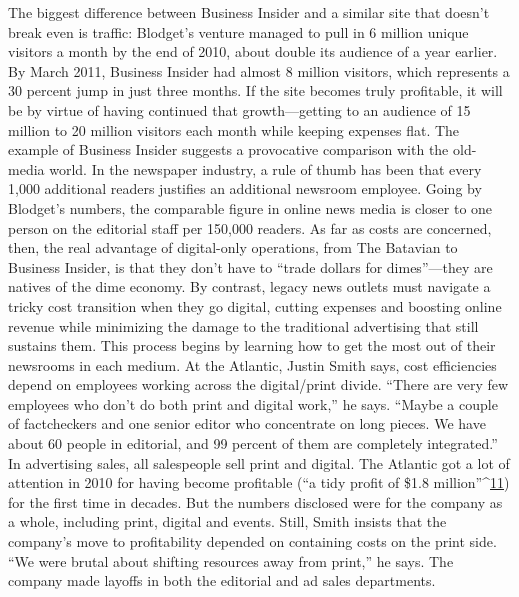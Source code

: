 
The biggest difference between Business Insider and a similar site that doesn't
break even is traffic: Blodget's venture managed to pull in 6 million unique visitors
a month by the end of 2010, about double its audience of a year earlier. By
March 2011, Business Insider had almost 8 million visitors, which represents a 30
percent jump in just three months. If the site becomes truly profitable, it will be
by virtue of having continued that growth—getting to an audience of 15 million
to 20 million visitors each month while keeping expenses flat.
The example of Business Insider suggests a provocative comparison with the
old-media world. In the newspaper industry, a rule of thumb has been that every
1,000 additional readers justifies an additional newsroom employee. Going by
Blodget's numbers, the comparable figure in online news media is closer to one
person on the editorial staff per 150,000 readers.
As far as costs are concerned, then, the real advantage of digital-only operations,
from The Batavian to Business Insider, is that they don't have to ``trade
dollars for dimes''—they are natives of the dime economy. By contrast, legacy
news outlets must navigate a tricky cost transition when they go digital, cutting
expenses and boosting online revenue while minimizing the damage to the traditional
advertising that still sustains them.
This process begins by learning how to get the most out of their newsrooms
in each medium. At the Atlantic, Justin Smith says, cost efficiencies depend on
employees working across the digital/print divide. ``There are very few employees
who don't do both print and digital work,'' he says. ``Maybe a couple of factcheckers
and one senior editor who concentrate on long pieces. We have about
60 people in editorial, and 99 percent of them are completely integrated.'' In
advertising sales, all salespeople sell print and digital.
The Atlantic got a lot of attention in 2010 for having become profitable (``a
tidy profit of \$1.8 million''^{\href{#endnotes-chapter-7}{11}}) for the first time in decades. But the numbers disclosed
were for the company as a whole, including print, digital and events. Still,
Smith insists that the company's move to profitability depended on containing
costs on the print side. ``We were brutal about shifting resources away from print,''
he says. The company made layoffs in both the editorial and ad sales departments.
